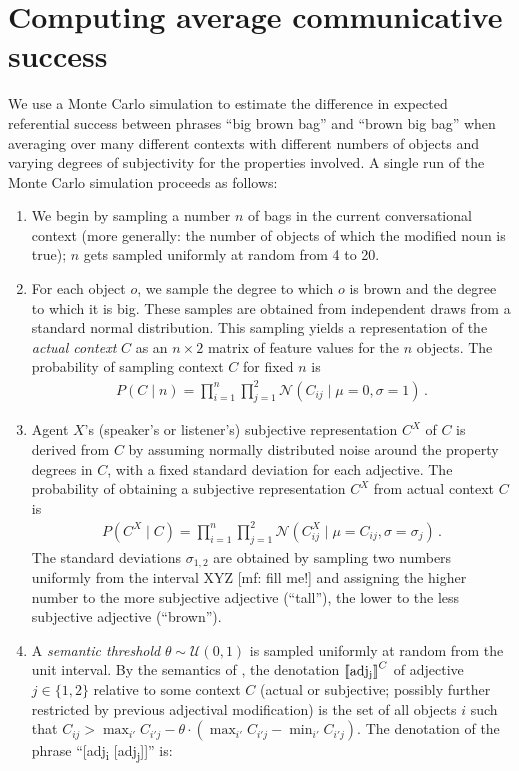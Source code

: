 \documentclass[10pt,a4paper]{article}
\newcommand{\sem}[1]{\mbox{$[\![$#1$]\!]$}}
\newcommand{\mf}[1]{\textcolor{BrickRed}{[mf: #1]}}
\begin{document}
\section{Computing average communicative success}

We use a Monte Carlo simulation to estimate the difference in expected referential success between phrases ``big brown bag'' and ``brown big bag'' when averaging over many different contexts with different numbers of objects and varying degrees of subjectivity for the properties involved. A single run of the Monte Carlo simulation proceeds as follows:

\begin{enumerate}
\item We begin by sampling a number $n$ of bags in the current conversational context (more generally: the number of objects of which the modified noun is true); $n$ gets sampled uniformly at random from 4 to 20. 
\item For each object $o$, we sample the degree to which $o$ is brown and the degree to which it is big. These samples are obtained from independent draws from a standard normal distribution. This sampling yields a representation of the \emph{actual context} $C$ as an $n \times 2$ matrix of feature values for the $n$ objects. The probability of sampling context $C$ for fixed $n$ is
  \begin{align*}
  P(C \mid n) = \prod_{i=1}^n \prod_{j=1}^2 \mathcal{N}(C_{ij} \mid \mu = 0, \sigma = 1)\,.
  \end{align*}
\item Agent $X$'s (speaker's or listener's) subjective representation $C^X$ of $C$ is derived from $C$ by assuming normally distributed noise around the property degrees in $C$, with a fixed standard deviation for each adjective. The probability of obtaining a subjective representation $C^X$ from actual context $C$ is
  \begin{align*}
P(C^X \mid C) = \prod_{i=1}^n \prod_{j=1}^2 \mathcal{N}(C_{ij}^X \mid \mu = C_{ij}, \sigma = \sigma_j)\,.
  \end{align*}
The standard deviations $\sigma_{1,2}$ are obtained by sampling two numbers uniformly from the interval XYZ \mf{fill me!} and assigning the higher number to the more subjective adjective (``tall''), the lower to the less subjective adjective (``brown'').
\item A \emph{semantic threshold} $\theta \sim \mathcal{U}(0,1)$ is sampled uniformly at random from the unit interval. By the semantics of , the denotation $\sem{adj\textsubscript{j}}^{C}$ of adjective $j \in \{1,2\}$ relative to some context $C$ (actual or subjective; possibly further restricted by previous adjectival modification) is the set of all objects $i$ such that $C_{ij} > \max_{i'}C_{i'j} - \theta \cdot (\max_{i'}C_{i'j} - \min_{i'}C_{i'j})$. The denotation of the phrase ``[adj\textsubscript{i} [adj\textsubscript{j}]]'' is:

\end{enumerate}
\end{document}
